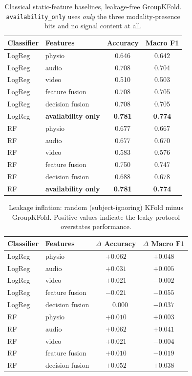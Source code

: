 \documentclass[11pt,a4paper]{article}
\newcommand{\code}[1]{\texttt{\small #1}}
\newcommand{\alert}[1]{\textcolor{alertred}{\textbf{#1}}}
\begin{document}
\begin{table}[h]\centering\small
\caption{Classical static-feature baselines, leakage-free GroupKFold.
\code{availability\_only} uses \emph{only} the three modality-presence bits and no signal
content at all.}
\begin{tabular}{llcc}
\toprule
Classifier & Features & Accuracy & Macro F1 \\
\midrule
LogReg & physio            & 0.646 & 0.642 \\
LogReg & audio             & 0.708 & 0.704 \\
LogReg & video             & 0.510 & 0.503 \\
LogReg & feature fusion    & 0.708 & 0.705 \\
LogReg & decision fusion   & 0.708 & 0.705 \\
LogReg & \alert{availability only} & \alert{0.781} & \alert{0.774} \\
\midrule
RF & physio            & 0.677 & 0.667 \\
RF & audio             & 0.677 & 0.670 \\
RF & video             & 0.583 & 0.576 \\
RF & feature fusion    & 0.750 & 0.747 \\
RF & decision fusion   & 0.688 & 0.678 \\
RF & \alert{availability only} & \alert{0.781} & \alert{0.774} \\
\bottomrule
\end{tabular}
\end{table}

\begin{table}[h]\centering\small
\caption{Leakage inflation: random (subject-ignoring) KFold minus GroupKFold. Positive
values indicate the leaky protocol overstates performance.}
\begin{tabular}{llcc}
\toprule
Classifier & Features & $\Delta$ Accuracy & $\Delta$ Macro F1 \\
\midrule
LogReg & physio          & $+0.062$ & $+0.048$ \\
LogReg & audio           & $+0.031$ & $+0.005$ \\
LogReg & video           & $+0.021$ & $-0.002$ \\
LogReg & feature fusion  & $-0.021$ & $-0.055$ \\
LogReg & decision fusion & $\phantom{+}0.000$ & $-0.037$ \\
RF & physio          & $+0.010$ & $+0.003$ \\
RF & audio           & $+0.062$ & $+0.041$ \\
RF & video           & $+0.021$ & $-0.004$ \\
RF & feature fusion  & $+0.010$ & $-0.019$ \\
RF & decision fusion & $+0.052$ & $+0.038$ \\
\bottomrule
\end{tabular}
\end{table}
\end{document}
